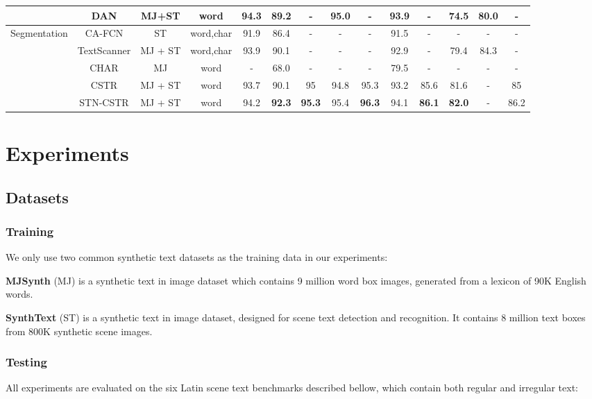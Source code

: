 \documentclass[final]{cvpr}
\begin{document}
\begin{table*}[ht]
{\begin{tabular}{ | c | c | c | c | c | c | c | c | c | c | c | c| c | c |}
		    & DAN \cite{wang2020decoupled} & MJ+ST & word & 94.3 & 89.2 & - & 95.0 & - & 93.9 & - & 74.5 & 80.0 & - \\
		\hline
		\multirow{3}{*}{Segmentation}
		    & CA-FCN \cite{liao2019scene} & ST & word,char & 91.9 & 86.4 & - & - & - & 91.5 & - & - & - & - \\ 
		    & TextScanner\cite{wan2020textscanner} & MJ + ST & word,char & 93.9 & 90.1 & - & - & - & 92.9 & - & 79.4 & 84.3 & - \\ 
		\hline
		\multirow{3}{*}{Classification}
		    & CHAR\cite{jaderberg14c} & MJ & word & - & 68.0 & - & - & - & 79.5 & - & - & - & - \\ 
		    & CSTR & MJ + ST & word & 93.7 & 90.1 & 95 & 94.8 & 95.3 & 93.2 & 85.6 & 81.6 & - & 85 \\ 
		    & STN-CSTR & MJ + ST & word & 94.2 & \textbf{92.3} & \textbf{95.3} & 95.4 & \textbf{96.3} & 94.1 & \textbf{86.1} & \textbf{82.0} & - & 86.2 \\
		\hline 
	\end{tabular}
	} 
\end{table*}

\section{Experiments}

\subsection{Datasets}


\subsubsection{Training}
We only use two common synthetic text datasets as the training data in our experiments:

\textbf{MJSynth} (MJ) \cite{jaderberg14c} is a synthetic text in image dataset which contains 9 million word box images, generated from a lexicon of 90K English words.

\textbf{SynthText} (ST) \cite{gupta2016synthetic} is a synthetic text in image dataset, designed for scene text detection and recognition. It contains 8 million text boxes from 800K synthetic scene images.
\subsubsection{Testing}

All experiments are evaluated on the six Latin scene text benchmarks described bellow, which contain both regular and irregular text:
\end{document}
